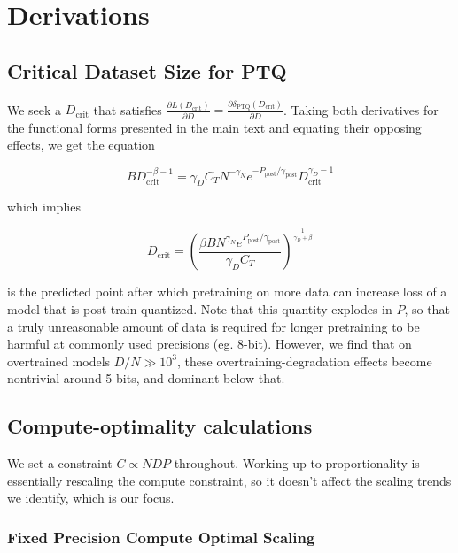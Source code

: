 \documentclass[11pt]{article}
\begin{document}
\section{Derivations}
\label{appdx: derivations}

\subsection{Critical Dataset Size for PTQ}

We seek a $D_\text{crit}$ that satisfies $\frac{\partial L(D_\text{crit})}{\partial D} = \frac{\partial \delta_\text{PTQ}(D_\text{crit})}{\partial D}$. Taking both derivatives for the functional forms presented in the main text and equating their opposing effects, we get the equation 

\begin{equation}
    BD_\text{crit}^{-\beta - 1} = \gamma_D C_T N^{-\gamma_N}e^{-P_\text{post}/\gamma_\text{post}}D_\text{crit}^{\gamma_D-1}
\end{equation}

which implies 

\begin{equation}
    D_\text{crit}=\left(\frac{\beta B N^{\gamma_N} e^{P_\text{post} / \gamma_\text{post}}}{\gamma_D C_T}\right)^{\frac{1}{\gamma_D+\beta}}
\end{equation}

is the predicted point after which pretraining on more data can increase loss of a model that is post-train quantized. Note that this quantity explodes in $P$, so that a truly unreasonable amount of data is required for longer pretraining to be harmful at commonly used precisions (eg. 8-bit). However, we find that on overtrained models $D/N \gg 10^3$, these overtraining-degradation effects become nontrivial around 5-bits, and dominant below that. 

\subsection{Compute-optimality calculations}

We set a constraint $C \propto NDP$ throughout. Working up to proportionality is essentially rescaling the compute constraint, so it doesn't affect the scaling trends we identify, which is our focus. 

\subsubsection{Fixed Precision Compute Optimal Scaling}
\end{document}
